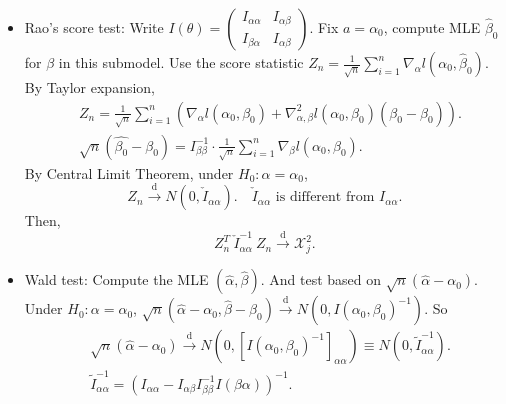 \documentclass[a4paper]{article}
\begin{document}
\begin{itemize}[leftmargin=*]
	\item Rao's score test: Write $I(\theta) = \begin{pmatrix}
		I_{\alpha\alpha} & I_{\alpha\beta} \\
		I_{\beta\alpha} & I_{\alpha\beta}
	\end{pmatrix}$. Fix $a = \alpha_0$, compute MLE $\hat{\beta}_0$ for $\beta$ in this submodel. Use the score statistic $Z_n = \frac{1}{\sqrt{n}} \sum\limits_{i=1}^n \nabla_{\alpha} l(\alpha_0,\hat{\beta}_0)$. By Taylor expansion,
	\begin{equation*}
		\begin{aligned}
			& Z_n = \frac{1}{\sqrt{n}} \sum\limits_{i=1}^n \left(\nabla_{\alpha} l(\alpha_0,\beta_0) +  \nabla_{\alpha,\beta}^2 l(\alpha_0,\beta_0) (\hat{\beta_0}-\beta_0)\right). \\
			& \sqrt{n} (\hat{\beta_0}-\beta_0) = I_{\beta\beta}^{-1} \cdot \frac{1}{\sqrt{n}} \sum\limits_{i=1}^n \nabla_{\beta} l(\alpha_0,\beta_0).
		\end{aligned}
	\end{equation*}
	By Central Limit Theorem, under $H_0: \alpha = \alpha_0$,
	\begin{equation*}
		Z_n \stackrel{\text{d}}{\longrightarrow} N \left(0,\check{I}_{\alpha\alpha}\right). \quad \text{$\check{I}_{\alpha\alpha}$ is different from $I_{\alpha\alpha}$.}
	\end{equation*}
	Then,
	\begin{equation*}
		Z_n^T \ \check{I}_{\alpha\alpha}^{-1} \ Z_n \stackrel{\text{d}}{\longrightarrow} \mathcal{X}_j^2.
	\end{equation*}
	\item Wald test: Compute the MLE $(\hat{\alpha},\hat{\beta})$. And test based on $\sqrt{n} \left(\hat{\alpha} - \alpha_0\right)$. Under $H_0: \alpha = \alpha_0$, $\sqrt{n}\left(\hat{\alpha} - \alpha_0,\hat{\beta} - \beta_0\right) \stackrel{\text{d}}{\longrightarrow} N\left(0,I(\alpha_0,\beta_0)^{-1}\right)$. So
	\begin{equation*}
		\begin{aligned}
			& \sqrt{n} \left(\hat{\alpha} - \alpha_0\right) \stackrel{\text{d}}{\longrightarrow} N \left(0,\left[I(\alpha_0,\beta_0)^{-1}\right]_{\alpha\alpha}\right) \equiv N \left(0, \tilde{I}_{\alpha\alpha}^{-1}\right). \\
			& \tilde{I}_{\alpha\alpha}^{-1} = \left(I_{\alpha\alpha} - I_{\alpha\beta} I_{\beta\beta}^{-1}I(\beta\alpha)\right)^{-1}.
		\end{aligned}

\end{equation*}
\end{itemize}
\end{document}
